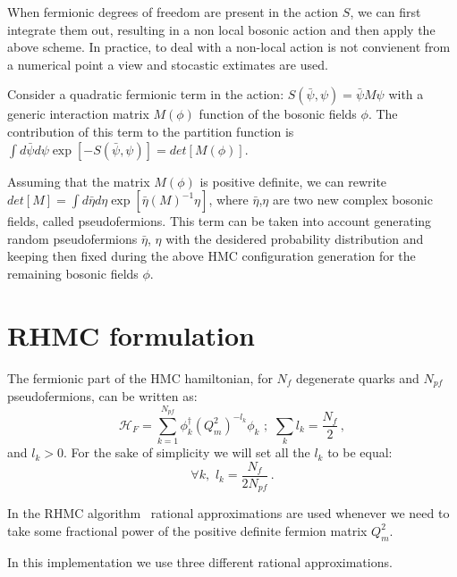 \documentclass{article}[12pt]
\begin{document}
When fermionic degrees of freedom are present in the action $S$, we can first integrate them out, resulting in a non
local bosonic action and then apply the above scheme. In practice, to deal with a non-local action is not convienent
from a numerical point a view and stocastic extimates are used.

Consider a quadratic fermionic term  in the action: $S(\bar\psi,\psi) = \bar\psi M \psi$ with a generic interaction
matrix $M(\phi)$ function of the bosonic fields $\phi$. The contribution of this term to the partition function
is $\int d\bar\psi d\psi \exp [ -S(\bar\psi,\psi)] = det[M(\phi)]$.

Assuming that the matrix $M(\phi)$ is positive definite,
we can rewrite $det[M]=\int d\bar\eta d\eta \exp[ \bar\eta (M)^{-1} \eta ]$, where $\bar\eta$,$\eta$ are two new
complex bosonic fields, called pseudofermions.
This term can be taken into account generating random pseudofermions $\bar\eta$, $\eta$ with the desidered probability
distribution and keeping then fixed during the above HMC configuration generation for the remaining bosonic fields $\phi$.



\section{RHMC formulation}

The fermionic part of the HMC hamiltonian, for $N_f$ degenerate
quarks and $N_{pf}$ pseudofermions, can be written as:
%
\begin{equation}
\mathcal{H}_F = \sum_{k=1}^{N_{pf}} \phi_k^\dagger ( Q_m^2 )^{-l_k} \phi_k \,\, ;\,\, \sum_k l_k = \frac{N_f}{2}\, , \label{HFN}
\end{equation}
and $l_k>0$. For the sake of simplicity we will set all the $l_k$ to be equal:
\begin{equation}
\forall k,\,\, l_k = \frac{N_f}{2N_{pf}}\, .
\end{equation}

In the RHMC algorithm~\cite{Clark:2005sq} rational approximations are used whenever we need to take some
fractional power of the positive definite fermion matrix $Q_m^2$.

In this implementation we use three different rational approximations.
\end{document}
